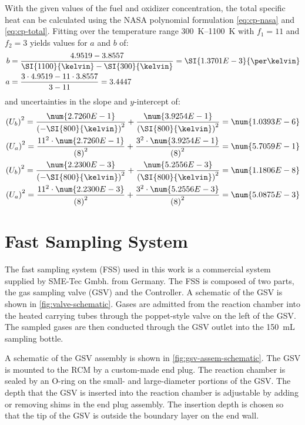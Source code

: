 \documentclass[../main.tex]{subfiles}
\begin{document}
With the given values of the fuel and oxidizer concentration, the total
specific heat can be calculated using the NASA polynomial formulation
\cref{eq:cp-nasa} and \cref{eq:cp-total}. Fitting over the temperature
range \SIrange{300}{1100}{\kelvin} with $f_1 = 11$ and $f_2 = 3$ yields
values for $a$ and $b$ of:
%
\begin{align*}
b &= \frac{4.9519 - 3.8557}{\SI{1100}{\kelvin} - \SI{300}{\kelvin}} = \SI{1.3701E-3}{\per\kelvin} \\
a &= \frac{3 \cdot 4.9519 - 11 \cdot 3.8557}{3 - 11} = 3.4447
\end{align*}
%
and uncertainties in the slope and $y$-intercept of:
%
\begin{align*}
\left(U_{b}\right)^2 = \frac{\num{2.7260E-1}}{\left(-\SI{800}{\kelvin}\right)^2} + \frac{\num{3.9254E-1}}{\left(\SI{800}{\kelvin}\right)^2} = \num{1.0393E-6} \\
\left(U_{a}\right)^2 = \frac{11^2\cdot\num{2.7260E-1}}{\left(8\right)^2} + \frac{3^2\cdot\num{3.9254E-1}}{\left(8\right)^2} = \num{5.7059E-1} \\
\left(U_{b}\right)^2 = \frac{\num{2.2300E-3}}{\left(-\SI{800}{\kelvin}\right)^2} + \frac{\num{5.2556E-3}}{\left(\SI{800}{\kelvin}\right)^2} = \num{1.1806E-8} \\
\left(U_{a}\right)^2 = \frac{11^2\cdot\num{2.2300E-3}}{\left(8\right)^2} + \frac{3^2\cdot\num{5.2556E-3}}{\left(8\right)^2} = \num{5.0875E-3}
\end{align*}

\section{Fast Sampling System}
\label{sec:fast-sampling}

The fast sampling system (FSS) used in this work is a commercial system supplied by
SME-Tec Gmbh. from Germany. The FSS is composed of two parts, the gas sampling valve
(GSV) and the Controller. A schematic of the GSV is shown in \cref{fig:valve-schematic}.
Gases are admitted from the reaction chamber into the heated carrying tubes
through the poppet-style valve on the left of the GSV. The sampled gases are then
conducted through the GSV outlet into the \SI{150}{\milli\liter} sampling bottle.

A schematic of the GSV assembly is shown in \cref{fig:gsv-assem-schematic}.
The GSV is mounted to the RCM by a custom-made end plug. The reaction chamber
is sealed by an O-ring on the small- and large-diameter portions of the GSV.
The depth that the GSV is inserted into the reaction chamber is adjustable
by adding or removing shims in the end plug assembly. The insertion depth
is chosen so that the tip of the GSV is outside the boundary layer on the
end wall.
\end{document}
